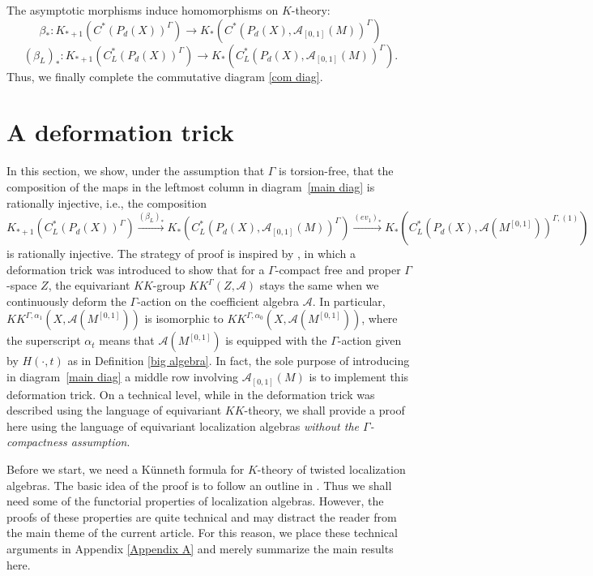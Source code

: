 \documentclass[11pt]{article}
\theoremstyle{definition}
\theoremstyle{plain}
\def\A{\mathcal A}\def\C{\mathcal C}\def\B{\mathcal B}\def\E{\mathcal E}\def\O{\mathcal O}\def\h{\mathfrak h}\def\K{\mathcal K}\def\F{\mathcal F}\def\P{\mathcal P}\def\L{\mathcal L}\def\R{\mathcal R}\def\Q{\mathcal Q}\def\H{\mathcal H}\def\S{\mathcal S}\def\N{\mathcal N}\def\U{\mathcal U}\def\V{\mathcal V}
\def\Ga{\Gamma}
\begin{document}
The asymptotic morphisms induce homomorphisms on $K$-theory:
$$\beta_*:K_{*+1}(C^*(P_d(X))^{\Ga})\to K_*(C^*(P_d(X),\A_{[0,1]}(M))^{\Ga})$$
$$(\beta_L)_*:K_{*+1}(C^*_L(P_d(X))^{\Ga})\to K_*(C^*_L(P_d(X),\A_{[0,1]}(M))^{\Ga}).$$
Thus, we finally complete the commutative diagram \eqref{com diag}.%







\section{A deformation trick}\label{sec: A deformation trick}

In this section, we show, under the assumption that $\Gamma$ is torsion-free, that the composition of the maps in the leftmost column in diagram~\eqref{main diag} is rationally injective, i.e., the composition
$$K_{*+1}(C^*_L(P_d(X))^{\Ga})\xrightarrow{(\beta_L)_*} K_*(C^*_L(P_d(X),\A_{[0,1]}(M))^{\Ga})\xrightarrow{(ev_1)_*} K_*(C^*_L(P_d(X),\A(M^{[0,1]}))^{\Ga,(1)})$$
is rationally injective. The strategy of proof is inspired by \cite{GWY2018}, in which a deformation trick was introduced to show that for a $\Ga$-compact free and proper $\Ga$-space $Z$, the equivariant $KK$-group $KK^{\Ga}(Z,\A)$ stays the same when we continuously deform the $\Gamma$-action on the coefficient algebra $\A$. In particular, $KK^{\Ga,\alpha_1}(X,\A(M^{[0,1]}))$ is isomorphic to $KK^{\Ga,\alpha_0}(X,\A(M^{[0,1]}))$, where the superscript $\alpha_t$ means that $\A(M^{[0,1]})$ is equipped with the $\Ga$-action given by $H(\cdot,t)$ as in Definition \ref{big algebra}. In fact, the sole purpose of introducing in diagram~\eqref{main diag} a middle row involving $\A_{[0,1]}(M)$ is to implement this deformation trick. On a technical level, while in \cite{GWY2018} the deformation trick was described using the language of equivariant $KK$-theory, we shall provide a proof here using the language of equivariant localization algebras \emph{without the $\Ga$-compactness assumption}.


Before we start, we need a K\"unneth formula for $K$-theory of twisted localization algebras. The basic idea of the proof is to follow an outline in \cite{Duke1987}. Thus we shall need some of the functorial properties of localization algebras. However, the proofs of these properties are quite technical and may distract the reader from the main theme of the current article. For this reason, we place these technical arguments in Appendix \ref{Appendix A} and merely summarize the main results here.
\end{document}
